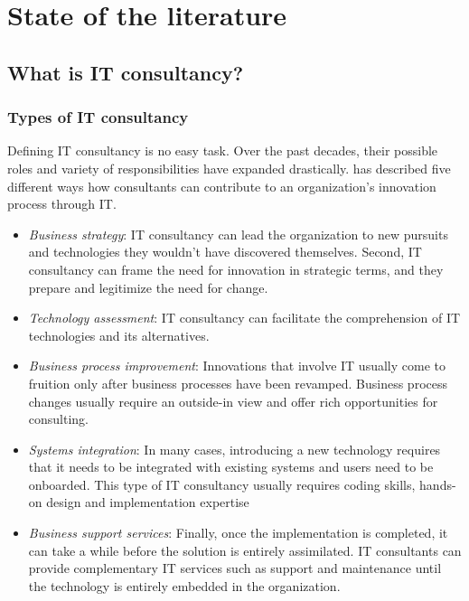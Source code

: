 \documentclass[12pt]{article}
\providecommand{\tightlist}{%
  \setlength{\itemsep}{0pt}\setlength{\parskip}{0pt}}
\begin{document}
\hypertarget{state-of-the-literature}{%
\section{State of the literature}\label{state-of-the-literature}}

\hypertarget{what-is-it-consultancy}{%
\subsection{What is IT consultancy?}\label{what-is-it-consultancy}}

\hypertarget{types-of-it-consultancy}{%
\subsubsection{Types of IT consultancy}\label{types-of-it-consultancy}}

Defining IT consultancy is no easy task. Over the past decades, their
possible roles and variety of responsibilities have expanded
drastically. \citet[20-25]{swanson2010} has described five different
ways how consultants can contribute to an organization's innovation
process through IT.

\begin{itemize}
\tightlist
\item
  \emph{Business strategy}: IT consultancy can lead the organization to
  new pursuits and technologies they wouldn't have discovered
  themselves. Second, IT consultancy can frame the need for innovation
  in strategic terms, and they prepare and legitimize the need for
  change.
\item
  \emph{Technology assessment}: IT consultancy can facilitate the
  comprehension of IT technologies and its alternatives.
\item
  \emph{Business process improvement}: Innovations that involve IT
  usually come to fruition only after business processes have been
  revamped. Business process changes usually require an outside-in view
  and offer rich opportunities for consulting.
\item
  \emph{Systems integration}: In many cases, introducing a new
  technology requires that it needs to be integrated with existing
  systems and users need to be onboarded. This type of IT consultancy
  usually requires coding skills, hands-on design and implementation
  expertise
\item
  \emph{Business support services}: Finally, once the implementation is
  completed, it can take a while before the solution is entirely
  assimilated. IT consultants can provide complementary IT services such
  as support and maintenance until the technology is entirely embedded
  in the organization.
\end{itemize}
\end{document}
